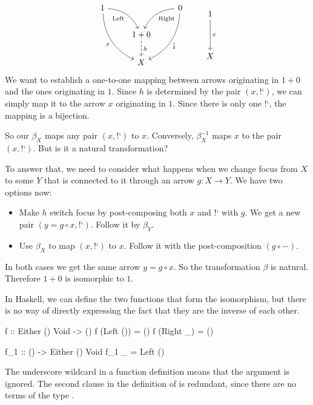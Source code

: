 \documentclass[DaoFP]{subfiles}
\begin{document}
\[
 \begin{tikzcd}
 1
 \arrow[dr,  bend left, "\text{Left}"']
 \arrow[ddr, bend right, "x"']
 && 0
 \arrow[dl, bend right, "\text{Right}"]
 \arrow[ddl, bend left, "\mbox{!`}"]
 \\
&1 + 0
\arrow[d, dashed, "h"]
\\
& X
 \end{tikzcd}
 \qquad
 \begin{tikzcd}
 1
 \arrow[dd, "x"]
 \\
 \\
 X
 \end{tikzcd}
\]
We want to establish a one-to-one mapping between arrows originating in $1+0$ and the ones originating in $1$. Since $h$ is determined by the pair $(x, \mbox{!`})$, we can simply map it to the arrow $x$ originating in $1$. Since there is only one $\mbox{!`}$, the mapping is a bijection. 

So our $\beta_X$ maps any pair $(x, \mbox{!`})$ to $x$. Conversely, $\beta^{-1}_X$ maps $x$ to the pair $(x, \mbox{!`})$. But is it a natural transformation? 

To answer that, we need to consider what happens when we change focus from $X$ to some $Y$ that is connected to it through an arrow $g \colon X \to Y$. We have two options now:
\begin{itemize}
\item Make $h$ switch focus by post-composing both $x$ and $\mbox{!`}$ with $g$. We get a new pair $(y = g \circ x, \mbox{!`})$. Follow it by $\beta_Y$.
\item Use $\beta_X$ to map $(x, \mbox{!`})$ to $x$. Follow it with the post-composition $(g \circ -)$. 
\end{itemize}
In both cases we get the same arrow $y = g \circ x$. So the transformation $\beta$ is natural. Therefore $1 + 0$ is isomorphic to $1$.

In Haskell, we can define the two functions that form the isomorphism, but there is no way of directly expressing the fact that they are the inverse of each other.
\begin{haskell}
f :: Either () Void -> ()
f (Left ()) = ()
f (Right _) = ()

f_1 :: () -> Either () Void
f_1 _ = Left ()
\end{haskell}
The underscore wildcard in a function definition means that the argument is ignored. The second clause in the definition of  is redundant, since there are no terms of the type . 
\end{document}

